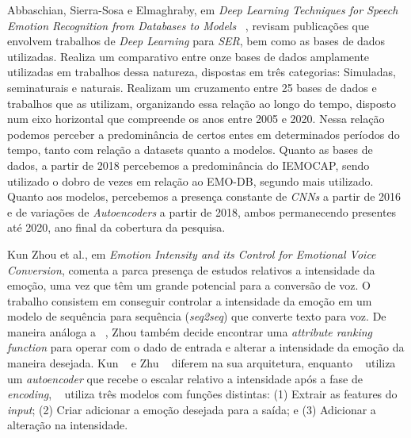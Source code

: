 Abbaschian, Sierra-Sosa e Elmaghraby, em \textit{Deep Learning Techniques for Speech Emotion Recognition from Databases to Models} ~\cite{32}, revisam publicações que envolvem trabalhos de \textit{Deep Learning} para \textit{SER}, bem como as bases de dados utilizadas. Realiza um comparativo entre onze bases de dados amplamente utilizadas em trabalhos dessa natureza, dispostas em três categorias: Simuladas, seminaturais e naturais. Realizam um cruzamento entre 25 bases de dados e trabalhos que as utilizam, organizando essa relação ao longo do tempo, disposto num eixo horizontal que compreende os anos entre 2005 e 2020. Nessa relação podemos perceber a predominância de certos entes em determinados períodos do tempo, tanto com relação a datasets quanto a modelos. Quanto as bases de dados, a partir de 2018 percebemos a predominância do IEMOCAP, sendo utilizado o dobro de vezes em relação ao EMO-DB, segundo mais utilizado. Quanto aos modelos, percebemos a presença constante de \textit{CNNs} a partir de 2016 e de variações de \textit{Autoencoders} a partir de 2018, ambos permanecendo presentes até 2020, ano final da cobertura da pesquisa.

Kun Zhou et al., em \textit{Emotion Intensity and its Control for Emotional Voice Conversion}\cite{18}, comenta a parca presença de estudos relativos a intensidade da emoção, uma vez que têm um grande potencial para a conversão de voz. O trabalho consistem em conseguir controlar a intensidade da emoção em um modelo de sequência para sequência (\textit{seq2seq}) que converte texto para voz. De maneira análoga a ~\cite{63}, Zhou também decide encontrar uma \textit{attribute ranking function} para operar com o dado de entrada e alterar a intensidade da emoção da maneira desejada. Kun ~\cite{18} e Zhu ~\cite{63} diferem na sua arquitetura, enquanto ~\cite{63} utiliza um \textit{autoencoder} que recebe o escalar relativo a intensidade após a fase de \textit{encoding}, ~\cite{18} utiliza três modelos com funções distintas: (1) Extrair as features do \textit{input}; (2) Criar adicionar a emoção desejada para a saída; e (3) Adicionar a alteração na intensidade.  %


